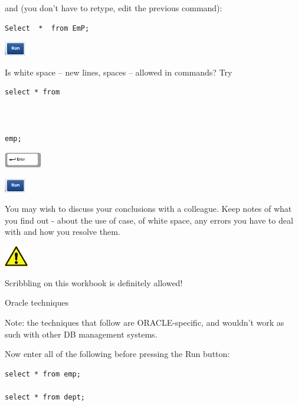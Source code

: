and (you don't have to retype, edit the previous command):

\begin{lstlisting}
Select  *  from EmP;
\end{lstlisting}

\includegraphics[width=0.947cm,height=0.607cm]{images/img (9).png}


Is white space -- new lines, spaces -- allowed in commands? Try


\begin{lstlisting}
select * from  



emp; 
\end{lstlisting}
 
\includegraphics[width=1.63cm,height=0.683cm]{images/img (8).png}

\includegraphics[width=0.947cm,height=0.607cm]{images/img (9).png}

You may wish to discuss your conclusions with a colleague. Keep notes of what you find out - about the use of case, of white space, any errors you have to deal with and how you resolve them.

\begin{center}
  
\includegraphics[width=1.048cm,height=0.903cm]{images/img (2).png}

\end{center}
Scribbling on this workbook is definitely allowed!

Oracle techniques

Note: the techniques that follow are ORACLE-specific, and wouldn't work as such with other DB management systems.

Now enter all of the following before pressing the Run button:


\begin{lstlisting}
select * from emp;  

select * from dept;
\end{lstlisting}  

